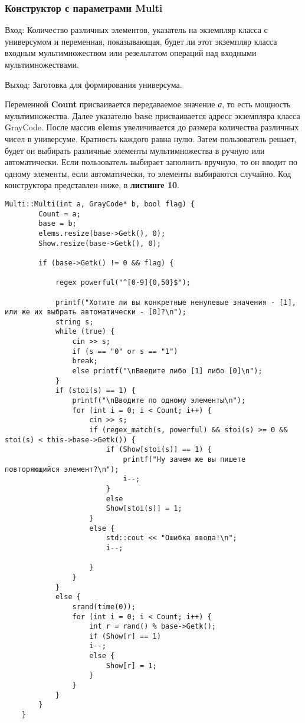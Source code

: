 \documentclass[10pt,a4paper,final]{article} %
\begin{document}
\subsubsection {Конструктор с параметрами Multi}
\par Вход: Количество различных элементов, указатель на экземпляр класса с универсумом и переменная, показывающая, будет ли этот экземпляр класса входным мультимножеством или резельтатом операций над входными мультимножествами.
\par Выход: Заготовка для формирования универсума.
\par Переменной \textbf{Count} присваивается передаваемое значение \textit{а}, то есть мощность мультимножества. Далее указателю \textbf{base} присваивается адресс экземпляра класса GrayCode. После массив \textbf{elems} увеличивается до размера количества различных чисел в универсуме. Кратность каждого равна нулю. Затем пользователь решает, будет он выбирать различные элементы мультимножества в ручную или автоматически. Если пользователь выбирает заполнить вручную, то он вводит по одному элементы, если автоматически, то элементы выбираются случайно. Код конструктора представлен ниже, в \textbf{листинге 10}.

\begin{lstlisting}[caption={Конструктор Multi}]
	Multi::Multi(int a, GrayCode* b, bool flag) {
		Count = a;
		base = b;
		elems.resize(base->Getk(), 0);
		Show.resize(base->Getk(), 0);
		
		if (base->Getk() != 0 && flag) {
			
			regex powerful("^[0-9]{0,50}$");
			
			printf("Хотите ли вы конкретные ненулевые значения - [1], или же их выбрать автоматически - [0]?\n");
			string s;
			while (true) {
				cin >> s;
				if (s == "0" or s == "1")
				break;
				else printf("\nВведите либо [1] либо [0]\n");
			}
			if (stoi(s) == 1) {
				printf("\nВводите по одному элементы\n");
				for (int i = 0; i < Count; i++) {
					cin >> s;
					if (regex_match(s, powerful) && stoi(s) >= 0 && stoi(s) < this->base->Getk()) {
						if (Show[stoi(s)] == 1) {
							printf("Ну зачем же вы пишете повторяющийся элемент?\n");
							i--;
						}
						else
						Show[stoi(s)] = 1;
					}
					else {
						std::cout << "Ошибка ввода!\n";
						i--;
						
					}
				}
			}
			else {
				srand(time(0));
				for (int i = 0; i < Count; i++) {
					int r = rand() % base->Getk();
					if (Show[r] == 1)
					i--;
					else {
						Show[r] = 1;
					}
				}
			}
		}
	}
\end{lstlisting}
\end{document}
